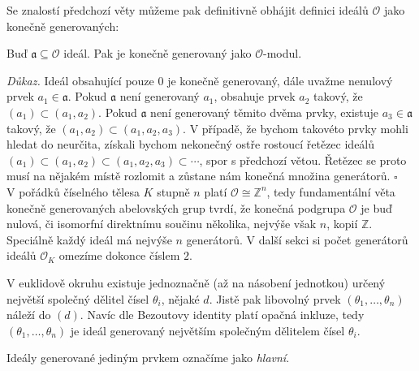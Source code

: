 \documentclass[12pt]{report}
\begin{document}

Se znalostí předchozí věty můžeme pak definitivně obhájit definici ideálů $\mathcal{O}$ jako konečně generovaných:
\begin{veta}
Buď $\mathfrak{a} \subseteq \mathcal{O}$ ideál. Pak je konečně generovaný jako $\mathcal{O}$-modul.
\end{veta}
\noindent \textit{Důkaz.} Ideál obsahující pouze $0$ je konečně generovaný, dále uvažme nenulový prvek $a_1 \in \mathfrak{a}$. Pokud $\mathfrak{a}$ není generovaný $a_1$, obsahuje prvek $a_2$ takový, že $(a_1) \subset (a_1,a_2)$. Pokud $\mathfrak{a}$ není generovaný těmito dvěma prvky, existuje $a_3 \in \mathfrak{a}$ takový, že $(a_1,a_2) \subset (a_1,a_2,a_3)$. V případě, že bychom takovéto prvky mohli hledat do neurčita, získali bychom nekonečný ostře rostoucí řetězec ideálů $(a_1) \subset (a_1,a_2) \subset (a_1,a_2,a_3) \subset \cdots$, spor s předchozí větou. Řetězec se proto musí na nějakém místě rozlomit a zůstane nám konečná množina generátorů. \hfill $\square$\\


V pořádků číselného tělesa $K$ stupně $n$ platí $\mathcal{O} \cong \mathbb{Z}^{n}$, tedy fundamentální věta konečně generovaných abelovských grup tvrdí, že konečná podgrupa $\mathcal{O}$ je buď nulová, či isomorfní direktnímu součinu několika, nejvýše však $n$, kopií $\mathbb{Z}$. Speciálně každý ideál má nejvýše $n$ generátorů. V další sekci si počet generátorů ideálů $\mathcal{O}_K$ omezíme dokonce číslem $2$.

V euklidově okruhu existuje jednoznačně (až na násobení jednotkou) určený největší společný dělitel čísel $\theta_i$, nějaké $d$. Jistě pak libovolný prvek $(\theta_1,\dots,\theta_n)$ náleží do $(d)$. Navíc dle Bezoutovy identity platí opačná inkluze, tedy $(\theta_1,\dots,\theta_n)$ je ideál generovaný největším společným dělitelem čísel $\theta_i$.  

\begin{definice}
Ideály generované jediným prvkem označíme jako \textit{hlavní}.
\end{definice}
\end{document}
